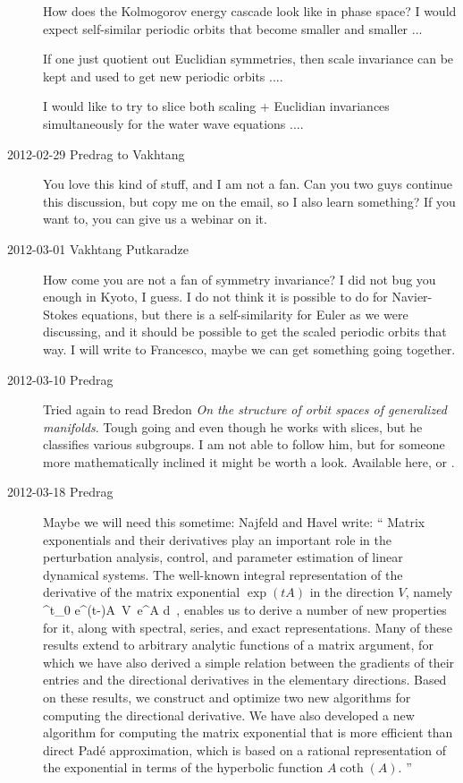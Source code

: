 \begin{description}
How does the Kolmogorov energy cascade look like in phase space?  I
would expect self-similar periodic orbits that become smaller and
smaller ...

If one just quotient out Euclidian symmetries, then scale invariance
can be kept and used to get new periodic orbits ....

I would like to try to slice both scaling + Euclidian invariances
simultaneously for the water wave equations ....

\item[2012-02-29 Predrag to Vakhtang] You love this kind of stuff, and I
am not a fan. Can you two guys continue this discussion, but copy me on
the email, so I also learn something? If you want to, you can give us a
webinar on it.

\item[2012-03-01 Vakhtang Putkaradze] How come you are not a fan of
symmetry invariance? I did not bug you enough in Kyoto, I guess. I do not
think it is possible to do for Navier-Stokes equations, but there is a
self-similarity for Euler as we were discussing, and it should be
possible to get the scaled periodic orbits that way. I will write to
Francesco, maybe we can get something going together.

\item[2012-03-10 Predrag] Tried again to read Bredon
\emph{On the structure of orbit spaces of generalized manifolds}. Tough
going and even though he works with slices, but he classifies various
subgroups. I am not able to follow him, but for someone more
mathematically inclined it might be worth a look. Available
{here}, or
.

\item[2012-03-18 Predrag] Maybe we will need this sometime:
Najfeld and  Havel  write: `` Matrix exponentials and their
derivatives play an important role in the perturbation analysis, control,
and parameter estimation of linear dynamical systems. The well-known
integral representation of the derivative of the matrix exponential
$\exp(tA)$ in the direction $V$, namely
\beq
\int^t_0 e^{(t-\tau)A}\, V \,e^{\tau A} d\tau
\,,
enables us to derive a number of new properties for it, along with
spectral, series, and exact representations. Many of these results extend
to arbitrary analytic functions of a matrix argument, for which we have
also derived a simple relation between the gradients of their entries and
the directional derivatives in the elementary directions. Based on these
results, we construct and optimize two new algorithms for computing the
directional derivative. We have also developed a new algorithm for
computing the matrix exponential that is more efficient than direct
Pad\'e approximation, which is based on a rational representation of the
exponential in terms of the hyperbolic function $A \coth(A)$.
''


\end{description}
